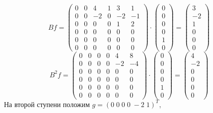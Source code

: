 \[
Bf = 
\begin{pmatrix}
0 & 0 & 4 & 1 & 3 & 1 \\
0 & 0 & -2 & 0 & -2 & -1 \\
0 & 0 & 0 & 0 & 1 & 2 \\
0 & 0 & 0 & 0 & 0 & 0 \\
0 & 0 & 0 & 0 & 0 & 0 \\
0 & 0 & 0 & 0 & 0 & 0
\end{pmatrix}
\cdot
\begin{pmatrix}
0 \\
0 \\
0 \\
0 \\
1 \\
0
\end{pmatrix}
=
\begin{pmatrix}
3 \\
-2 \\
1 \\
0 \\
0 \\
0 
\end{pmatrix}
\]
\[
B^2f = 
\begin{pmatrix}
0 & 0 & 0 & 0 & 4 & 8 \\
0 & 0 & 0 & 0 & -2 & -4 \\
0 & 0 & 0 & 0 & 0 & 0 \\
0 & 0 & 0 & 0 & 0 & 0 \\
0 & 0 & 0 & 0 & 0 & 0 \\
0 & 0 & 0 & 0 & 0 & 0
\end{pmatrix}
\cdot
\begin{pmatrix}
0 \\
0 \\
0 \\
0 \\
1 \\
0
\end{pmatrix}
=
\begin{pmatrix}
4 \\
-2 \\
0 \\
0 \\
0 \\
0 
\end{pmatrix}
\]
\noindent На второй ступени положим $g = (0 \; 0 \; 0 \; 0 \; -2 \;1)^T$,

